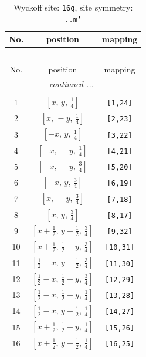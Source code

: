 \documentclass[fleqn,8pt]{jsarticle}
\begin{document}
\renewcommand{\arraystretch}{1.2}
\begin{longtable}{ccc}
\caption{Wyckoff site: {\tt 16q}, site symmetry: {\tt ..m'}}
 \\
 \hline \hline
No. & position & mapping \\ \hline \endfirsthead

\multicolumn{2}{l}{\tablename\ \thetable{}} \\
 \hline \hline
No. & position & mapping \\ \hline \endhead

 \hline \hline
\multicolumn{2}{r}{\footnotesize\it continued ...} \\ \endfoot

 \hline \hline
\multicolumn{2}{r}{} \\ \endlastfoot

1 & $\left[ x,\, y,\, \frac{1}{4} \right]$ & {\tt [1,24]} \\ \hline
2 & $\left[ x,\, - y,\, \frac{1}{4} \right]$ & {\tt [2,23]} \\ \hline
3 & $\left[ - x,\, y,\, \frac{1}{4} \right]$ & {\tt [3,22]} \\ \hline
4 & $\left[ - x,\, - y,\, \frac{1}{4} \right]$ & {\tt [4,21]} \\ \hline
5 & $\left[ - x,\, - y,\, \frac{3}{4} \right]$ & {\tt [5,20]} \\ \hline
6 & $\left[ - x,\, y,\, \frac{3}{4} \right]$ & {\tt [6,19]} \\ \hline
7 & $\left[ x,\, - y,\, \frac{3}{4} \right]$ & {\tt [7,18]} \\ \hline
8 & $\left[ x,\, y,\, \frac{3}{4} \right]$ & {\tt [8,17]} \\ \hline
9 & $\left[ x + \frac{1}{2},\, y + \frac{1}{2},\, \frac{3}{4} \right]$ & {\tt [9,32]} \\ \hline
10 & $\left[ x + \frac{1}{2},\, \frac{1}{2} - y,\, \frac{3}{4} \right]$ & {\tt [10,31]} \\ \hline
11 & $\left[ \frac{1}{2} - x,\, y + \frac{1}{2},\, \frac{3}{4} \right]$ & {\tt [11,30]} \\ \hline
12 & $\left[ \frac{1}{2} - x,\, \frac{1}{2} - y,\, \frac{3}{4} \right]$ & {\tt [12,29]} \\ \hline
13 & $\left[ \frac{1}{2} - x,\, \frac{1}{2} - y,\, \frac{1}{4} \right]$ & {\tt [13,28]} \\ \hline
14 & $\left[ \frac{1}{2} - x,\, y + \frac{1}{2},\, \frac{1}{4} \right]$ & {\tt [14,27]} \\ \hline
15 & $\left[ x + \frac{1}{2},\, \frac{1}{2} - y,\, \frac{1}{4} \right]$ & {\tt [15,26]} \\ \hline
16 & $\left[ x + \frac{1}{2},\, y + \frac{1}{2},\, \frac{1}{4} \right]$ & {\tt [16,25]} \\
\end{longtable}
\end{document}

